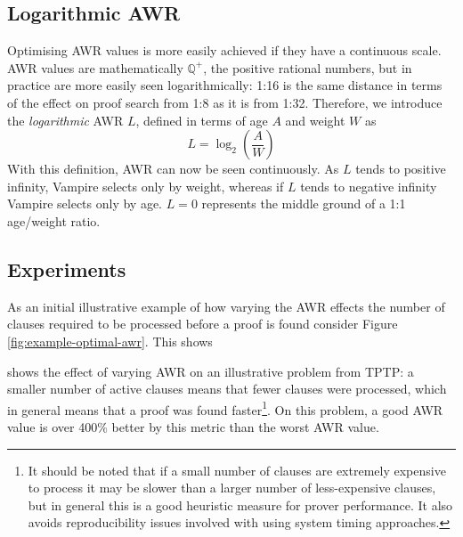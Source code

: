 \documentclass{llncs}
\begin{document}
\subsection{Logarithmic AWR}
Optimising AWR values is more easily achieved if they have a continuous scale.
AWR values are mathematically \(\mathbb{Q}^{+}\), the positive rational numbers, but in practice are more easily seen logarithmically: 1:16 is the same distance in terms of the effect on proof search from 1:8 as it is from 1:32.
Therefore, we introduce the \emph{logarithmic} AWR \(L\), defined in terms of age \(A\) and weight \(W\) as
\[
	L = \log_2{\left(\frac{A}{W}\right)}
\]
With this definition, AWR can now be seen continuously.
As \(L\) tends to positive infinity, Vampire selects only by weight, whereas if \(L\) tends to negative infinity Vampire selects only by age.
\(L = 0\) represents the middle ground of a 1:1 age/weight ratio.


\subsection{Experiments}
As an initial illustrative example of how varying the AWR effects the number of clauses required to be processed before a proof is found consider Figure \ref{fig:example-optimal-awr}. This shows 


  shows the effect of varying AWR on an illustrative problem from TPTP: a smaller number of active clauses means that fewer clauses were processed, which in general means that a proof was found faster\footnote{
It should be noted that if a small number of clauses are extremely expensive to process it may be slower than a larger number of less-expensive clauses, but in general this is a good heuristic measure for prover performance.
It also avoids reproducibility issues involved with using system timing approaches.
}.
On this problem, a good AWR value is over 400\% better by this metric than the worst AWR value.
\end{document}
